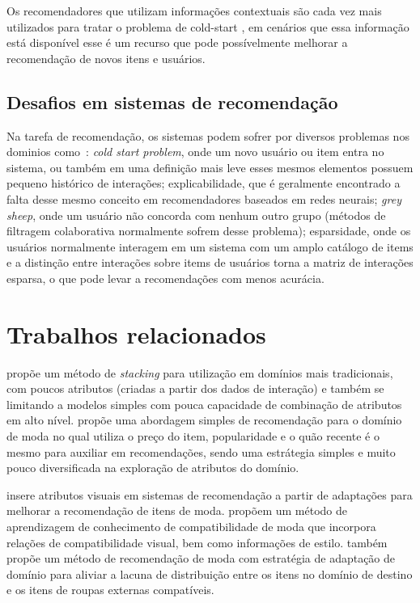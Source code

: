 \documentclass[sigconf]{acmart}
\begin{document}
Os recomendadores que utilizam informações contextuais são cada vez mais utilizados para tratar o problema de cold-start \cite{zeng2016online,song2014online}, em cenários que essa informação está disponível esse é um recurso que pode possívelmente melhorar a recomendação de novos itens e usuários.

\subsection{Desafios em sistemas de recomendação}

Na tarefa de recomendação, os sistemas podem sofrer por diversos problemas nos dominios como~\cite{khusro2016recommender}: \textit{cold start problem}, onde um novo usuário ou item entra no sistema, ou também em uma definição mais leve esses mesmos elementos possuem pequeno histórico de interações; explicabilidade, que é geralmente encontrado a falta desse mesmo conceito em recomendadores baseados em redes neurais; \textit{grey sheep}, onde um usuário não concorda com nenhum outro grupo (métodos de filtragem colaborativa normalmente sofrem desse problema); esparsidade, onde os usuários normalmente interagem em um sistema com um amplo catálogo de items e a distinção entre interações sobre items de usuários torna a matriz de interações esparsa, o que pode levar a recomendações com menos acurácia.


\section{Trabalhos relacionados}

\citeauthor{bao2009stacking} propõe um método de \textit{stacking} para utilização em domínios mais tradicionais, com poucos atributos (criadas a partir dos dados de interação) e também se limitando a modelos simples com pouca capacidade de combinação de atributos em alto nível. \citeauthor{nguyen2014learning} propõe uma abordagem simples de recomendação para o domínio de moda no qual utiliza o preço do item, popularidade e o quão recente é o mesmo para auxiliar em recomendações, sendo uma estrátegia simples e muito pouco diversificada na exploração de atributos do domínio.

\citeauthor{kang2017visually} insere atributos visuais em sistemas de recomendação a partir de adaptações para melhorar a recomendação de itens de moda. \citeauthor{yin2019enhancing} propõem um método de aprendizagem de conhecimento de compatibilidade de moda que incorpora relações de compatibilidade visual, bem como informações de estilo. também propõe um método de recomendação de moda com estratégia de adaptação de domínio para aliviar a lacuna de distribuição entre os itens no domínio de destino e os itens de roupas externas compatíveis.
\end{document}
